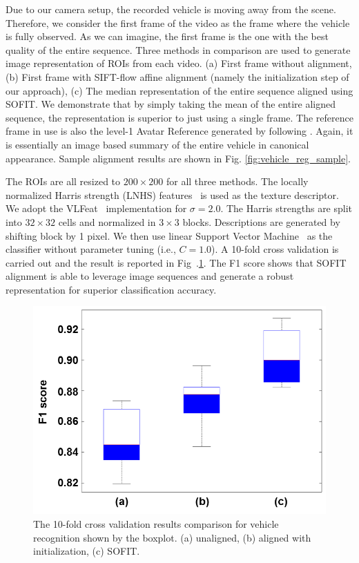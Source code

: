 \documentclass[10pt,journal]{IEEEtran}
\begin{document}
Due to our camera setup, the recorded vehicle is moving away from the scene. Therefore, we consider the first frame of the video as the frame where the vehicle is fully observed. As we can imagine, the first frame is the one with the best quality of the entire sequence. Three methods in comparison are used to generate image representation of ROIs from each video. (a) First frame without alignment, (b) First frame with SIFT-flow affine alignment (namely the initialization step of our approach), (c) The median representation of the entire sequence aligned using SOFIT. We demonstrate that by simply taking the mean of the entire aligned sequence, the representation is superior to just using a single frame. The reference frame in use is also the level-1 Avatar Reference generated by following \cite{Yang_SMCB12}. Again, it is essentially an image based summary of the entire vehicle in canonical appearance. Sample alignment results are shown in Fig. \ref{fig:vehicle_reg_sample}.

The ROIs are all resized to $200\times200$ for all three methods. The locally normalized Harris strength (LNHS) features~\cite{Pearce11} is used as the texture descriptor. We adopt the VLFeat~\cite{vlfeat} implementation for $\sigma=2.0$. The Harris strengths are split into $32\times32$ cells and normalized in $3\times3$ blocks. Descriptions are generated by shifting block by 1 pixel. We then use linear Support Vector Machine~\cite{sklearn} as the classifier without parameter tuning (i.e., $C=1.0$). A 10-fold cross validation is carried out and the result is reported in Fig~.\ref{fig:fig_vehicle_cls_f1}. The F1 score shows that SOFIT alignment is able to leverage image sequences and generate a robust representation for superior classification accuracy. 

\begin{figure}[htbp]
	\centering
		\includegraphics[width=.6\columnwidth]{fig/vehicle_cls_f1.png}
	\caption{The 10-fold cross validation results comparison for vehicle recognition shown by the boxplot. (a) unaligned, (b) aligned with initialization, (c) SOFIT.}
	\label{fig:fig_vehicle_cls_f1}
\end{figure}
\end{document}
